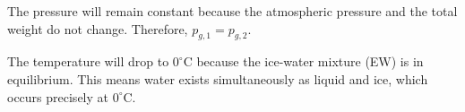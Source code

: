 The pressure will remain constant because the atmospheric pressure and the total weight do not change. Therefore, \( p_{g,1} = p_{g,2} \).  

The temperature will drop to \( 0^\circ \text{C} \) because the ice-water mixture (EW) is in equilibrium. This means water exists simultaneously as liquid and ice, which occurs precisely at \( 0^\circ \text{C} \).